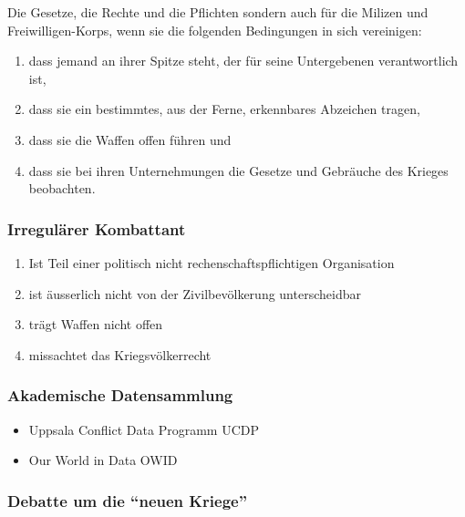 {}\documentclass[a4paper]{article}
\providecommand{\tightlist}{\setlength{\itemsep}{1mm}\setlength{\parskip}{1mm}}
\begin{document}
Die Gesetze, die Rechte und die Pflichten sondern auch für die Milizen
und Freiwilligen-Korps, wenn sie die folgenden Bedingungen in sich
vereinigen:

\begin{enumerate}
	\def\labelenumi{\arabic{enumi}.}
	\tightlist
	\item
	      dass jemand an ihrer Spitze steht, der für seine Untergebenen
	      verantwortlich ist,
	\item
	      dass sie ein bestimmtes, aus der Ferne, erkennbares Abzeichen tragen,
	\item
	      dass sie die Waffen offen führen und
	\item
	      dass sie bei ihren Unternehmungen die Gesetze und Gebräuche des
	      Krieges beobachten.
\end{enumerate}

\subsubsection{Irregulärer Kombattant}\label{irreguluxe4rer-kombattant}

\begin{enumerate}
	\def\labelenumi{\arabic{enumi}.}
	\tightlist
	\item
	      Ist Teil einer politisch nicht rechenschaftspflichtigen Organisation
	\item
	      ist äusserlich nicht von der Zivilbevölkerung unterscheidbar
	\item
	      trägt Waffen nicht offen
	\item
	      missachtet das Kriegsvölkerrecht
\end{enumerate}

\subsubsection{Akademische
	Datensammlung}\label{akademische-datensammlung}

\begin{itemize}
	\tightlist
	\item
	      Uppsala Conflict Data Programm UCDP
	\item
	      Our World in Data OWID
\end{itemize}

\subsubsection{Debatte um die ``neuen
	Kriege''}\label{debatte-um-die-neuen-kriege}
\end{document}
